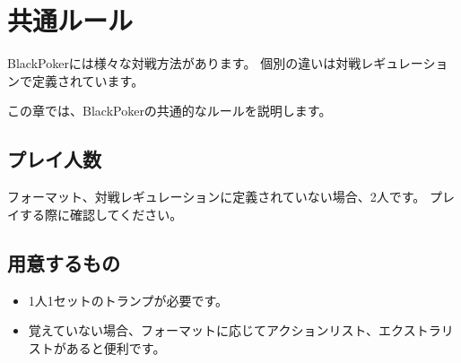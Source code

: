 \documentclass[letterpaper,10pt,dvipdfmx]{sphinxmanual}
\begin{document}
\sphinxstepscope


\chapter{共通ルール}
\label{\detokenize{common/common:common-rst}}\label{\detokenize{common/common:id1}}\label{\detokenize{common/common::doc}}
\sphinxAtStartPar
BlackPokerには様々な対戦方法があります。
個別の違いは対戦レギュレーションで定義されています。

\sphinxAtStartPar
この章では、BlackPokerの共通的なルールを説明します。


\section{プレイ人数}
\label{\detokenize{common/common:id2}}
\sphinxAtStartPar
フォーマット、対戦レギュレーションに定義されていない場合、2人です。
プレイする際に確認してください。


\section{用意するもの}
\label{\detokenize{common/common:id3}}\begin{itemize}
\item {} 
\sphinxAtStartPar
1人1セットのトランプが必要です。

\item {} 
\sphinxAtStartPar
覚えていない場合、フォーマットに応じてアクションリスト、エクストラリストがあると便利です。

\end{itemize}
\end{document}
